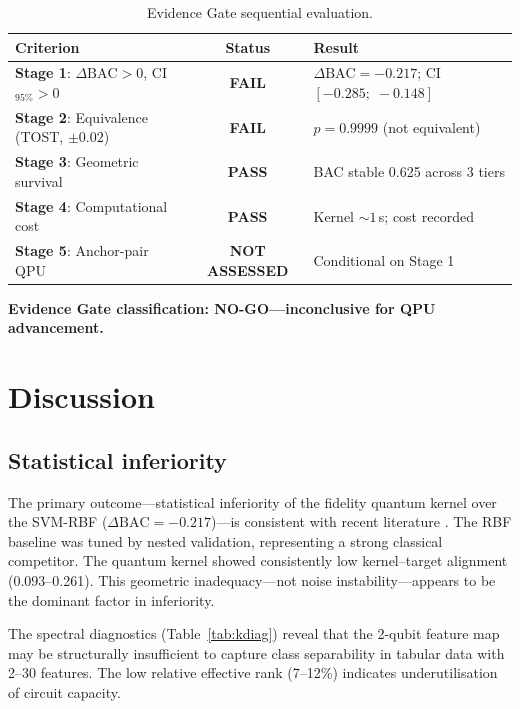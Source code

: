 \documentclass[11pt,a4paper]{article}
\newcommand{\BAC}{\mathrm{BAC}}
\begin{document}
\begin{table}[htbp]
\centering
\caption{Evidence Gate sequential evaluation.}
\label{tab:egate}
\smallskip
\begin{tabular}{@{}p{3.2cm}cp{5.5cm}@{}}
\toprule
Criterion & Status & Result \\
\midrule
\textbf{Stage 1}: $\Delta\BAC>0$, CI$_{95\%}>0$
  & \textbf{FAIL} & $\Delta\BAC=-0.217$; CI $[-0.285;\; -0.148]$ \\
\textbf{Stage 2}: Equivalence (TOST, $\pm 0.02$)
  & \textbf{FAIL} & $p=0.9999$ (not equivalent) \\
\textbf{Stage 3}: Geometric survival
  & \textbf{PASS} & BAC stable 0.625 across 3 tiers \\
\textbf{Stage 4}: Computational cost
  & \textbf{PASS} & Kernel $\sim 1$\,s; cost recorded \\
\textbf{Stage 5}: Anchor-pair QPU
  & \textbf{NOT ASSESSED} & Conditional on Stage 1 \\
\bottomrule
\end{tabular}
\end{table}

\noindent\textbf{Evidence Gate classification: NO-GO---inconclusive for QPU
advancement.}

\section{Discussion}
\label{sec:discussion}

\subsection{Statistical inferiority}
\label{ssec:disc_inferiority}

The primary outcome---statistical inferiority of the fidelity quantum kernel
over the SVM-RBF ($\Delta\BAC = -0.217$)---is consistent with recent
literature \citep{bowles2024better,kakavand2026benchmarking}. The RBF
baseline was tuned by nested validation, representing a strong classical
competitor. The quantum kernel showed consistently low kernel--target alignment
(0.093--0.261). This geometric inadequacy---not noise instability---appears
to be the dominant factor in inferiority.

The spectral diagnostics (Table~\ref{tab:kdiag}) reveal that the 2-qubit
feature map may be structurally insufficient to capture class separability in
tabular data with 2--30 features. The low relative effective rank (7--12\%)
indicates underutilisation of circuit capacity.
\end{document}
